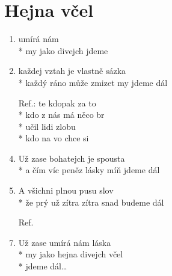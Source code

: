 \section{Hejna včel}
\begin{enumerate}
\item {} umírá nám  \\*
my jako  divejch  jdeme    
\item každej vztah je vlastně sázka \\*
každý ráno může zmizet                        my jdeme dál 
\item[Ref.:] te kdopak za to  \\*
kdo z nás má  něco br \\*
 učil lidi zlobu  \\*
kdo na vo chce si 
\item Už zase bohatejch je spousta \\*
a čím víc peněz lásky míň                    jdeme dál
\item A všichni plnou pusu slov \\*
že prý už zítra zítra snad                    budeme dál
\item[Ref.]
\item Už zase umírá nám láska \\*
my jako hejna divejch včel \\*
jdeme dál…
\end{enumerate}
